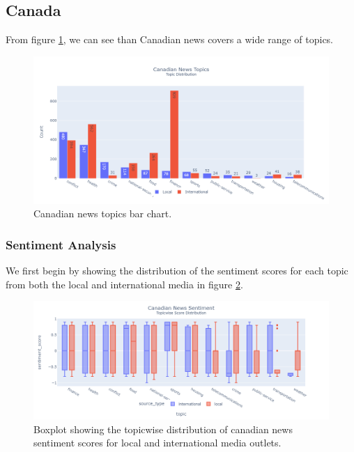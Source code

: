 \documentclass{article}
\theoremstyle{mytheoremstyle}
\theoremstyle{mytheoremstyle}
\theoremstyle{myproblemstyle}
\begin{document}
    \subsection{Canada}
    From figure \ref{fig:canada_topic}, we can see than Canadian news covers a wide range of topics.
    
    \begin{figure}[hp]
        \centering
        \includegraphics[width=\linewidth]{../images/plots/Canada/canada_barchart_topics.png}
        \caption{Canadian news topics bar chart.}
        \label{fig:canada_topic}
    \end{figure}

    \subsubsection{Sentiment Analysis}

    We first begin by showing the distribution of the sentiment scores for each topic from both the local and international media in figure \ref{fig:canada_sentiment_score_boxplot}. 
    
    \begin{figure}[hp]
        \centering
        \includegraphics[width=\linewidth]{../images/plots/Canada/canada_boxplot_sentiment.png}
        \caption{Boxplot showing the topicwise distribution of canadian news sentiment scores for local and international media outlets.}
        \label{fig:canada_sentiment_score_boxplot}
    \end{figure}
\end{document}
